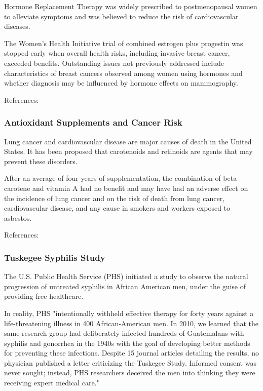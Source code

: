 Hormone Replacement Therapy was widely prescribed to postmenopausal women to alleviate symptoms and was believed to reduce the risk of cardiovascular diseases.

The Women's Health Initiative trial of combined estrogen plus progestin was stopped early when overall health risks, including invasive breast cancer, exceeded benefits. Outstanding issues not previously addressed include characteristics of breast cancers observed among women using hormones and whether diagnosis may be influenced by hormone effects on mammography.

References: \cite{JAMA2003}

\subsubsection{Antioxidant Supplements and Cancer Risk}

Lung cancer and cardiovascular disease are major causes of death in the United States. It has been proposed that carotenoids and retinoids are agents that may prevent these disorders.

After an average of four years of supplementation, the combination of beta carotene and vitamin A had no benefit and may have had an adverse effect on the incidence of lung cancer and on the risk of death from lung cancer, cardiovascular disease, and any cause in smokers and workers exposed to asbestos.

References: \cite{Omenn1996EffectsOA}

\subsubsection{Tuskegee Syphilis Study}

The U.S. Public Health Service (PHS) initiated a study to observe the natural progression of untreated syphilis in African American men, under the guise of providing free healthcare.

In reality, PHS "intentionally withheld effective therapy for forty years against a life-threatening illness in 400 African-American men. In 2010, we learned that the same research group had deliberately infected hundreds of Guatemalans with syphilis and gonorrhea in the 1940s with the goal of developing better methods for preventing these infections. Despite 15 journal articles detailing the results, no physician published a letter criticizing the Tuskegee Study. Informed consent was never sought; instead, PHS researchers deceived the men into thinking they were receiving expert medical care." 

